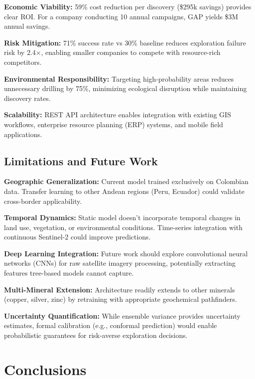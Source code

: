 \documentclass[12pt,a4paper]{article}
\begin{document}
\textbf{Economic Viability:} 59\% cost reduction per discovery (\$295k savings) provides clear ROI. For a company conducting 10 annual campaigns, GAP yields \$3M annual savings.

\textbf{Risk Mitigation:} 71\% success rate vs 30\% baseline reduces exploration failure risk by 2.4$\times$, enabling smaller companies to compete with resource-rich competitors.

\textbf{Environmental Responsibility:} Targeting high-probability areas reduces unnecessary drilling by 75\%, minimizing ecological disruption while maintaining discovery rates.

\textbf{Scalability:} REST API architecture enables integration with existing GIS workflows, enterprise resource planning (ERP) systems, and mobile field applications.

\subsection{Limitations and Future Work}

\textbf{Geographic Generalization:} Current model trained exclusively on Colombian data. Transfer learning to other Andean regions (Peru, Ecuador) could validate cross-border applicability.

\textbf{Temporal Dynamics:} Static model doesn't incorporate temporal changes in land use, vegetation, or environmental conditions. Time-series integration with continuous Sentinel-2 could improve predictions.

\textbf{Deep Learning Integration:} Future work should explore convolutional neural networks (CNNs) for raw satellite imagery processing, potentially extracting features tree-based models cannot capture.

\textbf{Multi-Mineral Extension:} Architecture readily extends to other minerals (copper, silver, zinc) by retraining with appropriate geochemical pathfinders.

\textbf{Uncertainty Quantification:} While ensemble variance provides uncertainty estimates, formal calibration (e.g., conformal prediction) would enable probabilistic guarantees for risk-averse exploration decisions.

\section{Conclusions}
\end{document}
